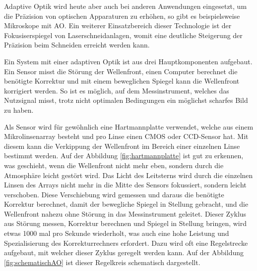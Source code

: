 \begin{refsection}
Adaptive Optik wird heute aber auch bei anderen Anwendungen eingesetzt, um die Präzision von optischen Apparaturen zu erhöhen, so gibt es beispielsweise Mikroskope mit AO. Ein weiterer Einsatzbereich dieser Technologie ist der Fokusiserspiegel von Laserschneidanlagen, womit eine deutliche Steigerung der Präzision beim Schneiden erreicht werden kann.

Ein System mit einer adaptiven Optik ist aus drei Hauptkomponenten aufgebaut. Ein Sensor misst die Störung der Wellenfront, einen Computer berechnet die benötigte Korrektur und mit einem beweglichen Spiegel kann die Wellenfront korrigiert werden. So ist es möglich, auf dem Messinstrument, welches das Nutzsignal misst, trotz nicht optimalen Bedingungen ein möglichst scharfes Bild zu haben.

Als Sensor wird für gewöhnlich eine Hartmannplatte verwendet, welche aus einem Mikrolinsenarray besteht und pro Linse einen CMOS oder CCD-Sensor hat. Mit diesem kann  die Verkippung der Wellenfront im Bereich einer einzelnen Linse bestimmt werden. Auf der Abbildung \ref{fig:hartmannplatte} ist gut zu erkennen, was geschieht, wenn die Wellenfront nicht mehr eben, sondern durch die Atmosphäre leicht gestört wird. Das Licht des Leitsterns wird durch die einzelnen Linsen des Arrays nicht mehr in die Mitte des Sensors fokussiert, sondern leicht verschoben. Diese Verschiebung wird gemessen und daraus die benötigte Korrektur berechnet, damit der bewegliche Spiegel in Stellung gebracht, und die Wellenfront nahezu ohne Störung in das Messinstrument geleitet. Dieser Zyklus aus Störung messen, Korrektur berechnen und Spiegel in Stellung bringen, wird etwas 1000 mal pro Sekunde wiederholt, was auch eine hohe Leistung und Spezialisierung des Korrekturrechners erfordert. Dazu wird oft eine Regelstrecke aufgebaut, mit welcher dieser Zyklus geregelt werden kann. Auf der Abbildung \ref{fig:schematischAO} ist dieser Regelkreis schematisch dargestellt.


\end{refsection}
